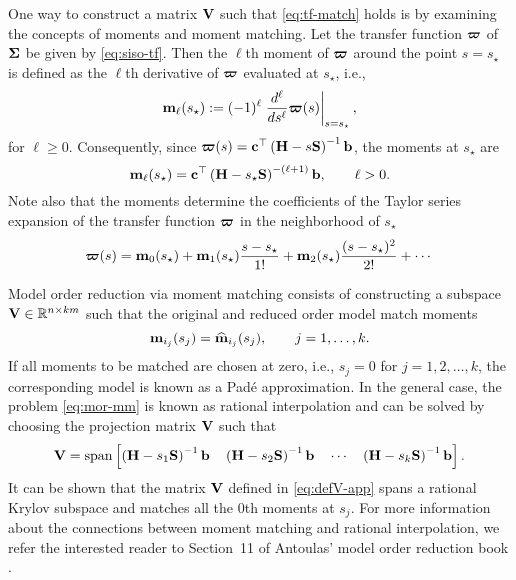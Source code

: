 One way to construct a matrix $\mathbf{V}$ such that \eqref{eq:tf-match} holds is by examining the concepts of moments and moment matching\cite{Antoulas2005}. Let the transfer function $\boldsymbol{\varpi}$ of $\mathbf{\Sigma}$ be given by \eqref{eq:siso-tf}. Then the $\ell$th moment of $\boldsymbol{\varpi}$ around the point $s = s_\star$ is defined as the $\ell$th derivative of $\boldsymbol{\varpi}$ evaluated at $s_\star$, i.e.,
\begin{equation}
  \mathbf{m}_\ell(s_\star) := (-1)^\ell \left.\frac{d^\ell}{ds^\ell} \boldsymbol{\varpi}(s) \right|_{s=s_\star},
  \label{eq:moment}
\end{equation}
for $\ell \geq 0$. Consequently, since $\boldsymbol{\varpi}(s) = \mathbf{c}^\top \left( \mathbf{H} - s\mathbf{S} \right)^{-1} \mathbf{b}$, the moments at $s_\star$ are
$$
  \mathbf{m}_\ell(s_\star) = \mathbf{c}^\top \left( \mathbf{H} - s_\star \mathbf{S} \right)^{-(\ell+1)} \mathbf{b}, \qquad \ell > 0.
$$
Note also that the moments determine the coefficients of the Taylor series expansion of the transfer function $\boldsymbol{\varpi}$ in the neighborhood of $s_\star$
\begin{equation}
  \boldsymbol{\varpi}(s) = \mathbf{m}_0(s_\star) + \mathbf{m}_1(s_\star) \frac{s - s_\star}{1!} + \mathbf{m}_2(s_\star) \frac{(s - s_\star)^2}{2!} + \cdots
\end{equation}

Model order reduction via moment matching consists of constructing a subspace $\bV \inR[n][km]$ such that the original and reduced order model match moments
\begin{equation}
  \mathbf{m}_{i_j}(s_j) = \widehat{\mathbf{m}}_{i_j}(s_j), \qquad j = 1,\ldots,k.
  \label{eq:mor-mm}
\end{equation}
If all moments to be matched are chosen at zero, i.e., $s_j = 0$ for $j = 1,2,\ldots,k$, the corresponding model is known as a Pad\'{e} approximation. In the general case, the problem \eqref{eq:mor-mm} is known as rational interpolation and can be solved by choosing the projection matrix $\mathbf{V}$ such that
\begin{equation}
  \mathbf{V} = \mathrm{span}\left[  \left( \mathbf{H} - s_1\mathbf{S} \right)^{-1} \mathbf{b} \quad
                   \left( \mathbf{H} - s_2\mathbf{S} \right)^{-1} \mathbf{b} \quad
                    \cdots \quad
                   \left( \mathbf{H} - s_k\mathbf{S} \right)^{-1} \mathbf{b}  \right].
  \label{eq:defV-app}
\end{equation}
It can be shown that the matrix $\mathbf{V}$ defined in \eqref{eq:defV-app} spans a rational Krylov subspace and matches all the $0$th moments at $s_j$. For more information about the connections between moment matching and rational interpolation, we refer the interested reader to Section~11 of Antoulas' model order reduction book \cite{Antoulas2005}.

